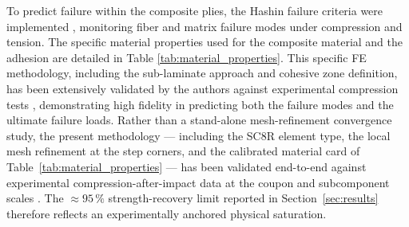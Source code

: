 \documentclass[
  preprint,
  12pt,
  a4paper
]{elsarticle}
\newcommand{\new}[1]{#1}
\begin{document}
To predict failure within the composite plies, the Hashin failure criteria were implemented \cite{hashin1980failure}, monitoring fiber and matrix failure modes under compression and tension. The specific material properties used for the composite material and the adhesion are detailed in Table \ref{tab:material_properties}. This specific FE methodology, including the sub-laminate approach and cohesive zone definition, has been extensively validated by the authors against experimental compression tests \cite{psarras2020evaluating, psarras2023evaluating}, demonstrating high fidelity in predicting both the failure modes and the ultimate failure loads. \new{Rather than a stand-alone mesh-refinement convergence study, the present methodology --- including the SC8R element type, the local mesh refinement at the step corners, and the calibrated material card of Table~\ref{tab:material_properties} --- has been validated end-to-end against experimental compression-after-impact data at the coupon and subcomponent scales \cite{psarras2024design, psarras2020evaluating, psarras2023evaluating}. The $\approx 95\,\%$ strength-recovery limit reported in Section~\ref{sec:results} therefore reflects an experimentally anchored physical saturation.}
\end{document}
